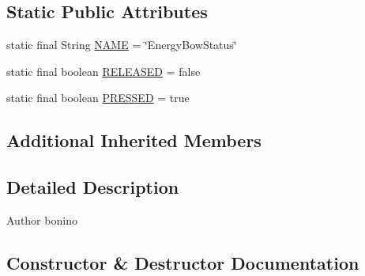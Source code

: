 \subsection*{Static Public Attributes}
\begin{DoxyCompactItemize}
\item 
static final String \hyperlink{classit_1_1polito_1_1elite_1_1enocean_1_1enj_1_1eep_1_1eep26_1_1attributes_1_1_e_e_p26_rocker_switch2_rocker_energy_bow_ae50cf9941ac2dc3b62604c39c4c2c829}{N\+A\+ME} = \char`\"{}Energy\+Bow\+Status\char`\"{}
\item 
static final boolean \hyperlink{classit_1_1polito_1_1elite_1_1enocean_1_1enj_1_1eep_1_1eep26_1_1attributes_1_1_e_e_p26_rocker_switch2_rocker_energy_bow_a054dd5ffa64518f6974e91d30e5596d6}{R\+E\+L\+E\+A\+S\+ED} = false
\item 
static final boolean \hyperlink{classit_1_1polito_1_1elite_1_1enocean_1_1enj_1_1eep_1_1eep26_1_1attributes_1_1_e_e_p26_rocker_switch2_rocker_energy_bow_a7cce5e463d5558655113a4d3589abc7a}{P\+R\+E\+S\+S\+ED} = true
\end{DoxyCompactItemize}
\subsection*{Additional Inherited Members}


\subsection{Detailed Description}
\begin{DoxyAuthor}{Author}
bonino 
\end{DoxyAuthor}


\subsection{Constructor \& Destructor Documentation}
\hypertarget{classit_1_1polito_1_1elite_1_1enocean_1_1enj_1_1eep_1_1eep26_1_1attributes_1_1_e_e_p26_rocker_switch2_rocker_energy_bow_a9461692192cba9125f058d10d810667d}{}\label{classit_1_1polito_1_1elite_1_1enocean_1_1enj_1_1eep_1_1eep26_1_1attributes_1_1_e_e_p26_rocker_switch2_rocker_energy_bow_a9461692192cba9125f058d10d810667d} 
